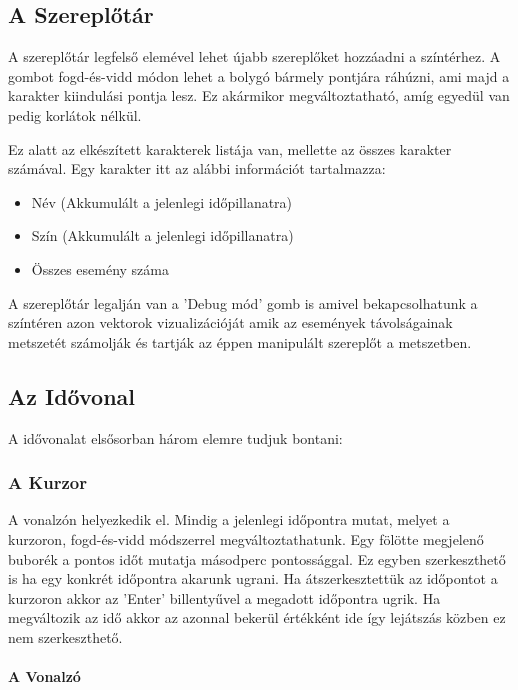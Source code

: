 \subsection{A Szereplőtár} \label{section:ui-actor-tool}

A szereplőtár legfelső elemével lehet újabb szereplőket hozzáadni a színtérhez. A gombot fogd-és-vidd módon lehet a bolygó bármely pontjára ráhúzni, ami majd a karakter kiindulási pontja lesz. Ez akármikor megváltoztatható, amíg egyedül van pedig korlátok nélkül.

Ez alatt az elkészített karakterek listája van, mellette az összes karakter számával. Egy karakter itt az alábbi információt tartalmazza:

\begin{itemize}
	\item Név (Akkumulált a jelenlegi időpillanatra)
	\item Szín (Akkumulált a jelenlegi időpillanatra)
	\item Összes esemény száma
\end{itemize}

A szereplőtár legalján van a 'Debug mód' gomb is amivel bekapcsolhatunk a színtéren azon vektorok vizualizációját amik az események távolságainak metszetét számolják és tartják az éppen manipulált szereplőt a metszetben.

\subsection{Az Idővonal} \label{section:ui-timeline}

A idővonalat elsősorban három elemre tudjuk bontani:

\subsubsection{A Kurzor}

A vonalzón helyezkedik el. Mindig a jelenlegi időpontra mutat, melyet a kurzoron, fogd-és-vidd módszerrel megváltoztathatunk. Egy fölötte megjelenő buborék a pontos időt mutatja másodperc pontossággal. Ez egyben szerkeszthető is ha egy konkrét időpontra akarunk ugrani. Ha átszerkesztettük az időpontot a kurzoron akkor az 'Enter' billentyűvel a megadott időpontra ugrik. Ha megváltozik az idő akkor az azonnal bekerül értékként ide így lejátszás közben ez nem szerkeszthető.

\paragraph{A Vonalzó}

